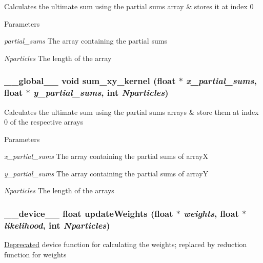 \label{ex__particle__CUDA__float_8cu_a72476d2a032e744c6b1c5835bec5a663}
Calculates the ultimate sum using the partial sums array \& stores it at index 0 
\begin{DoxyParams}{Parameters}
\item[{\em partial\_\-sums}]The array containing the partial sums \item[{\em Nparticles}]The length of the array \end{DoxyParams}
\hypertarget{ex__particle__CUDA__float_8cu_aa85678d886ca589fa6686cd2e11ebaea}{
\subsubsection[{sum\_\-xy\_\-kernel}]{\setlength{\rightskip}{0pt plus 5cm}\_\-\_\-global\_\-\_\- void sum\_\-xy\_\-kernel (float $\ast$ {\em x\_\-partial\_\-sums}, \/  float $\ast$ {\em y\_\-partial\_\-sums}, \/  int {\em Nparticles})}}
\label{ex__particle__CUDA__float_8cu_aa85678d886ca589fa6686cd2e11ebaea}
Calculates the ultimate sum using the partial sums arrays \& store them at index 0 of the respective arrays 
\begin{DoxyParams}{Parameters}
\item[{\em x\_\-partial\_\-sums}]The array containing the partial sums of arrayX \item[{\em y\_\-partial\_\-sums}]The array containing the partial sums of arrayY \item[{\em Nparticles}]The length of the arrays \end{DoxyParams}
\hypertarget{ex__particle__CUDA__float_8cu_a445a6138b006078cfdbd6314ced3ee73}{
\subsubsection[{updateWeights}]{\setlength{\rightskip}{0pt plus 5cm}\_\-\_\-device\_\-\_\- float updateWeights (float $\ast$ {\em weights}, \/  float $\ast$ {\em likelihood}, \/  int {\em Nparticles})}}
\label{ex__particle__CUDA__float_8cu_a445a6138b006078cfdbd6314ced3ee73}
\begin{Desc}
\item[\hyperlink{deprecated__deprecated000001}{Deprecated}]device function for calculating the weights; replaced by reduction function for weights \end{Desc}

